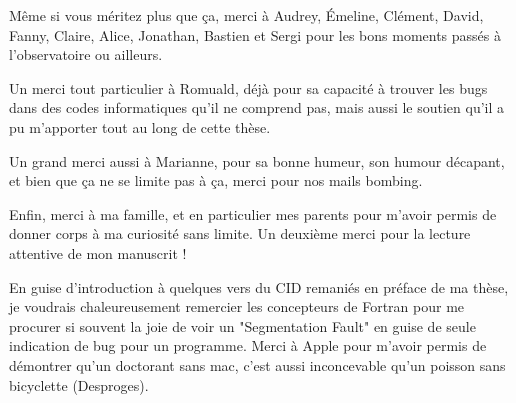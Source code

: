\bigskip

Même si vous méritez plus que ça, merci à Audrey, Émeline, Clément, David, Fanny, Claire,
Alice, Jonathan, Bastien et
Sergi pour les bons moments passés à l'observatoire ou ailleurs. 

Un merci tout particulier à Romuald, déjà pour sa capacité à trouver les bugs dans des codes informatiques qu'il ne comprend
pas, mais aussi le soutien qu'il a pu m'apporter tout au long de cette thèse. 

Un grand merci aussi à Marianne, pour sa bonne humeur, son humour décapant, et bien que ça ne se limite pas à ça, merci pour nos
mails bombing. 

Enfin, merci à ma famille, et en particulier mes parents pour m'avoir permis de donner corps à ma curiosité sans limite. Un deuxième merci pour la lecture attentive de mon manuscrit !

En guise d'introduction à quelques vers du CID remaniés en préface de ma thèse, je voudrais chaleureusement remercier les
concepteurs de Fortran pour me procurer si souvent la joie de voir un "Segmentation Fault" en guise de seule indication de bug
pour un programme. Merci à Apple pour m'avoir permis de démontrer qu'un doctorant sans mac, c'est aussi inconcevable qu'un
poisson sans bicyclette (\textcopyright Desproges). 


